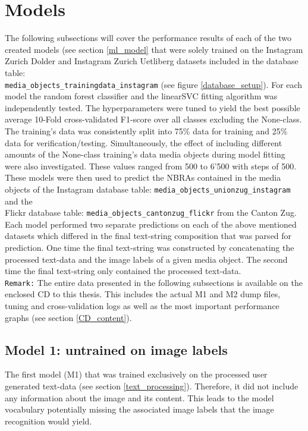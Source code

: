 \section{Models} \label{results_models}
The following subsections will cover the  performance results of each of the two created models (see section \ref{ml_model} that were solely trained on the Instagram Zurich Dolder and Instagram Zurich Uetliberg datasets included in the database table:\\ \texttt{media\_objects\_trainingdata\_instagram} (see figure \ref{database_setup}). For each model the random forest classifier and the linearSVC fitting algorithm was independently tested. The hyperparameters were tuned to yield the best possible average 10-Fold cross-validated F1-score over all classes excluding the None-class. The training's data was consistently split into 75\% data for training and 25\% data for verification/testing. Simultaneously, the effect of including different amounts of the None-class training's data media objects during model fitting were also investigated. These values ranged from 500 to 6'500 with steps of 500.\\
These models were then used to predict the NBRAs contained in the media objects of the Instagram database table: \texttt{media\_objects\_unionzug\_instagram} and the \\Flickr database table: \texttt{media\_objects\_cantonzug\_flickr} from the Canton Zug.\\
Each model performed two separate predictions on each of the above mentioned datasets which differed in the final text-string composition that was parsed for prediction. One time the final text-string was constructed by concatenating the processed text-data and the image labels of a given media object. The second time the final text-string only contained the processed text-data.\\
\newline
\texttt{Remark:} The entire data presented in the following subsections is available on the enclosed CD to this thesis. This includes the actual M1 and M2 dump files, tuning and cross-validation logs as well as the most important performance graphs (see section \ref{CD_content}).

\subsection{Model 1: untrained on image labels}
The first model (M1) that was trained exclusively on the processed user generated text-data (see section \ref{text_processing}). Therefore, it did not include any information about the image and its content. This leads to the model vocabulary potentially missing the associated image labels that the image recognition would yield.

